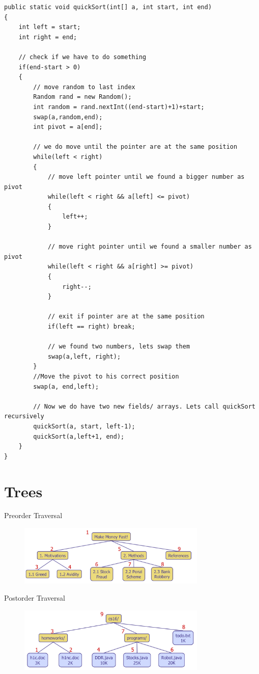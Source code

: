 \documentclass[a4paper,10pt]{report}
\begin{document}
\begin{lstlisting}
public static void quickSort(int[] a, int start, int end)
{
	int left = start;
	int right = end;
			
	// check if we have to do something
	if(end-start > 0)
	{		
		// move random to last index
		Random rand = new Random();
		int random = rand.nextInt((end-start)+1)+start;			
		swap(a,random,end);
		int pivot = a[end];			
		
		// we do move until the pointer are at the same position
		while(left < right)
		{
			// move left pointer until we found a bigger number as pivot
			while(left < right && a[left] <= pivot)
			{
				left++;
			}
			
			// move right pointer until we found a smaller number as pivot
			while(left < right && a[right] >= pivot)
			{
				right--;
			}
			
			// exit if pointer are at the same position
			if(left == right) break;
			
			// we found two numbers, lets swap them
			swap(a,left, right);
		}			
		//Move the pivot to his correct position
		swap(a, end,left);
		
		// Now we do have two new fields/ arrays. Lets call quickSort recursively
		quickSort(a, start, left-1);
		quickSort(a,left+1, end);
	}
}
\end{lstlisting}
\newpage
\section{Trees}
Preorder Traversal
\begin{figure}[H]
	\begin{center}
  		\includegraphics[width=0.8\textwidth]{img/preorder.png}
	\end{center}
\end{figure}
\noindent
Postorder Traversal
\begin{figure}[H]
	\begin{center}
  		\includegraphics[width=0.8\textwidth]{img/postorder.png}
	\end{center}
\end{figure}
\newpage
\end{document}

